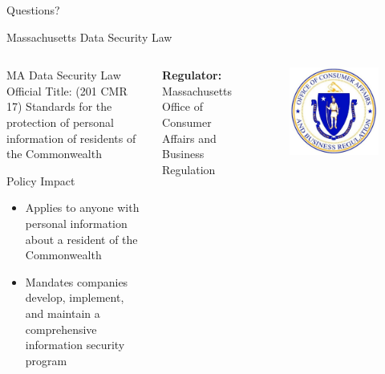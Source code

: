 \documentclass[10pt]{beamer}
\begin{document}
{
\begin{frame}[standout]
  Questions?
\end{frame}
}


\begin{frame}{Massachusetts Data Security Law}
  \begin{columns}
      \begin{exampleblock}{MA Data Security Law}
        Official Title: (201 CMR 17) Standards for the protection of personal information of residents of the Commonwealth
        \begin{center}Policy Impact\end{center}
        \begin{itemize}
            \item{Applies to anyone with  personal  information about  a  resident  of  the  Commonwealth}
            \item{Mandates companies develop, implement, and maintain a comprehensive information security program} 
        \end{itemize}
      \end{exampleblock}
      
    \textbf{Regulator:} Massachusetts Office of Consumer Affairs and Business Regulation
    \begin{figure}
	\includegraphics[width=\textwidth]{Figures/OCABR.jpg}
    \end{figure}
    \end{columns}
\end{frame}
\end{document}
